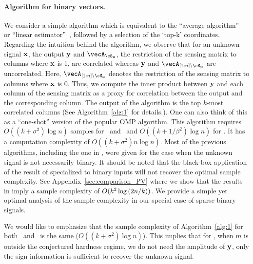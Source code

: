 \paragraph{Algorithm for binary vectors.} We consider a simple algorithm which is equivalent to the ``average algorithm''~\cite{servedio1999pac} or ``linear estimator''~\cite{vershyninPlan}, followed by a selection of the `top-k' coordinates. Regarding the intuition behind the algorithm, we observe that for an unknown signal $\mathbf{x}$, the output $\mathbf{y}$ and $\vecA_{\cS_{\bx}}$, the restriction of the sensing matrix to columns where $\mathbf{x}$ is 1,  are correlated whereas $\mathbf{y}$ and $\vecA_{[1:n]\setminus \cS_{\bx}}$ are uncorrelated. Here, $\vecA_{[1:n]\setminus \cS_{\bx}}$ denotes the restriction of the sensing matrix to columns where $\mathbf{x}$ is 0.  Thus, we compute the inner product between $\mathbf{y}$ and each column of the sensing matrix as a proxy for correlation between the output and the corresponding column. The output of the algorithm is the top $k$-most correlated columns (See Algorithm~\ref{alg:1} for details.). One can also think of this as a ``one-shot'' version of the popular OMP algorithm. This algorithm requires $O((k+\sigma^2)\log{n})$ samples for \bcs\ and \spl\, and $O((k+1/\beta^2)\log{n})$ for \logreg. It has a computation complexity of $O((k+\sigma^2)n\log{n})$. Most of the previous algorithms, including the one in \cite{vershyninPlan}, were given for the case when the unknown signal is not necessarily binary. It should be noted that the black-box application of the result of \cite{vershyninPlan}  specialized to binary inputs will not recover the optimal sample complexity. See Appendix~\ref{sec:comparison_PV} where we show that the results in \cite{vershyninPlan} imply a sample complexity of $O(k^2\log\left(2n/k\right))$. We provide a simple yet  optimal analysis of the sample complexity in our special case of  sparse binary signals. 

We would like to emphasize that the sample complexity of Algorithm~\ref{alg:1} for both \spl\ and \bcs\ is the same ($O((k+\sigma^2)\log{n})$). 
This implies that for \spl, when $m$ is outside the conjectured hardness regime, we do not need the amplitude of $\mathbf{y}$, only the sign information is sufficient to recover the unknown signal. 







